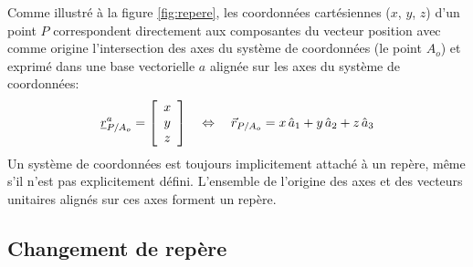 Comme illustré à la figure \ref{fig:repere}, les coordonnées cartésiennes ($x$, $y$, $z$) d'un point $P$ correspondent directement aux composantes du vecteur position avec comme origine l'intersection des axes du système de coordonnées (le point $A_o$) et exprimé dans une base vectorielle $a$ alignée sur les axes du système de coordonnées:
\begin{align}
\underline{r}_{P/A_o}^a = \left[ \begin{array}{c} 
x \\ y \\ z
\end{array} \right]   \quad \Leftrightarrow \quad
\vec{r}_{P/A_o} = x \, \hat{a}_{1} + y \, \hat{a}_{2} + z \, \hat{a}_{3}
\end{align} 
Un système de coordonnées est toujours implicitement attaché à un repère, même s'il n'est pas explicitement défini. L'ensemble de l'origine des axes et des vecteurs unitaires alignés sur ces axes forment un repère. 




\subsection{Changement de repère}
\label{sec:repchan}

